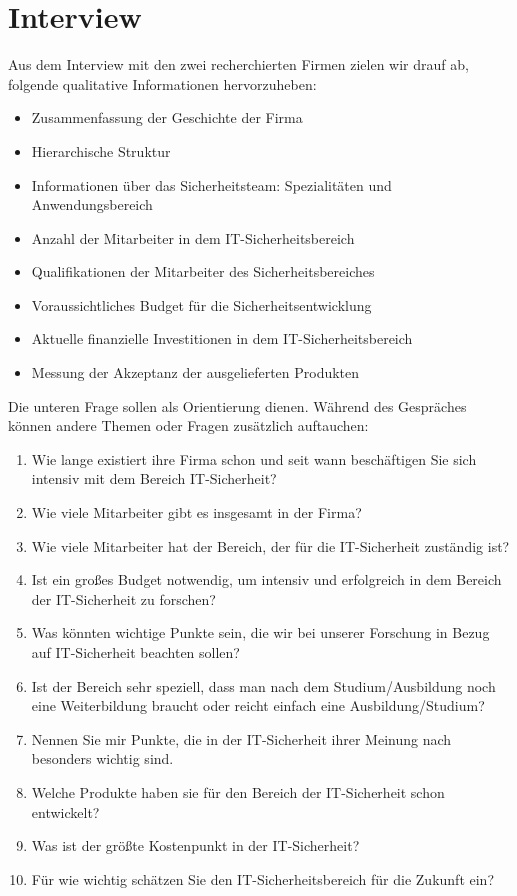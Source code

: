 \section{Interview}\label{appendix:interview}

Aus dem Interview mit den zwei recherchierten Firmen zielen wir drauf ab, folgende qualitative Informationen hervorzuheben:

\begin{itemize}
    \item Zusammenfassung der Geschichte der Firma
    \item Hierarchische Struktur
    \item Informationen über das Sicherheitsteam: Spezialitäten und Anwendungsbereich
    \item Anzahl der Mitarbeiter in dem IT-Sicherheitsbereich
    \item Qualifikationen der Mitarbeiter des Sicherheitsbereiches
    \item Voraussichtliches Budget für die Sicherheitsentwicklung
    \item Aktuelle finanzielle Investitionen in dem IT-Sicherheitsbereich
    \item Messung der Akzeptanz der ausgelieferten Produkten
\end{itemize}

Die unteren Frage sollen als Orientierung dienen. Während des Gespräches können andere Themen oder Fragen zusätzlich
auftauchen:

\begin{enumerate}
    \item Wie lange existiert ihre Firma schon und seit wann beschäftigen Sie sich intensiv mit dem Bereich IT-Sicherheit?
    \item Wie viele Mitarbeiter gibt es insgesamt in der Firma?
    \item Wie viele Mitarbeiter hat der Bereich, der für die IT-Sicherheit zuständig ist?
    \item Ist ein großes Budget notwendig, um intensiv und erfolgreich in dem Bereich der IT-Sicherheit zu forschen?
    \item Was könnten wichtige Punkte sein, die wir bei unserer Forschung in Bezug auf IT-Sicherheit beachten sollen?
    \item Ist der Bereich sehr speziell, dass man nach dem Studium/Ausbildung noch eine Weiterbildung braucht oder 
    reicht einfach eine Ausbildung/Studium?
    \item Nennen Sie mir Punkte, die in der IT-Sicherheit ihrer Meinung nach besonders wichtig sind.
    \item Welche Produkte haben sie für den Bereich der IT-Sicherheit schon entwickelt?
    \item Was ist der größte Kostenpunkt in der IT-Sicherheit?
    \item Für wie wichtig schätzen Sie den IT-Sicherheitsbereich für die Zukunft ein?
\end{enumerate}
